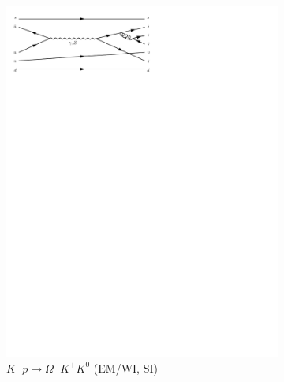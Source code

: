 \begin{figure}[h]
\begin{subfigure}[b]{0.3\textwidth}
    \includegraphics[trim={0.5cm 22cm 10cm 0cm},width=\textwidth]{../Diagrams/D6.pdf}
    \caption{$K^-p \rightarrow \Omega^-K^+K^0$ (EM/WI, SI)}
    \label{fey:6}
  \end{subfigure}
  \newline
  \newline
  \begin{subfigure}[b]{0.3\textwidth}

\end{subfigure}
\end{figure}
